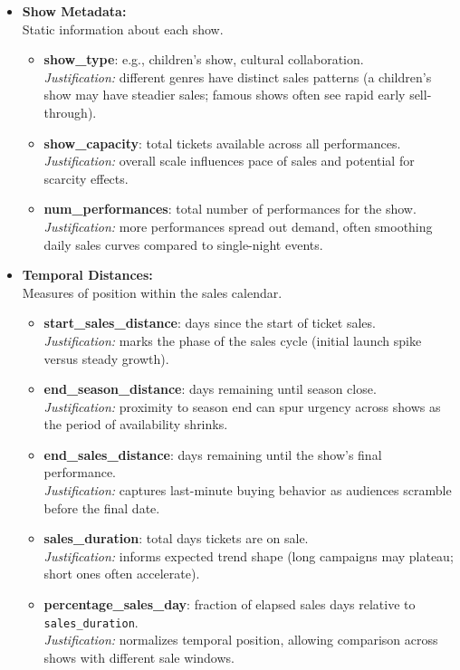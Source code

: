 \documentclass[a4paper,12pt]{report}  %
\begin{document}
\begin{itemize}
	\item \textbf{Show Metadata:}\\
	      Static information about each show.
	      \begin{itemize}
		      \item \textbf{show\_type}: e.g., children’s show, cultural collaboration.  \\
		            \emph{Justification:} different genres have distinct sales patterns (a children’s show may have steadier sales; famous shows often see rapid early sell-through).
		      \item \textbf{show\_capacity}: total tickets available across all performances.  \\
		            \emph{Justification:} overall scale influences pace of sales and potential for scarcity effects.
		      \item \textbf{num\_performances}: total number of performances for the show.  \\
		            \emph{Justification:} more performances spread out demand, often smoothing daily sales curves compared to single-night events.
	      \end{itemize}

	\item \textbf{Temporal Distances:}\\
	      Measures of position within the sales calendar.
	      \begin{itemize}
		      \item \textbf{start\_sales\_distance}: days since the start of ticket sales.  \\
		            \emph{Justification:} marks the phase of the sales cycle (initial launch spike versus steady growth).
		      \item \textbf{end\_season\_distance}: days remaining until season close.  \\
		            \emph{Justification:} proximity to season end can spur urgency across shows as the period of availability shrinks.
		      \item \textbf{end\_sales\_distance}: days remaining until the show’s final performance.  \\
		            \emph{Justification:} captures last-minute buying behavior as audiences scramble before the final date.
		      \item \textbf{sales\_duration}: total days tickets are on sale.  \\
		            \emph{Justification:} informs expected trend shape (long campaigns may plateau; short ones often accelerate).
		      \item \textbf{percentage\_sales\_day}: fraction of elapsed sales days relative to \texttt{sales\_duration}.  \\
		            \emph{Justification:} normalizes temporal position, allowing comparison across shows with different sale windows.
	      \end{itemize}
\end{itemize}
\end{document}
